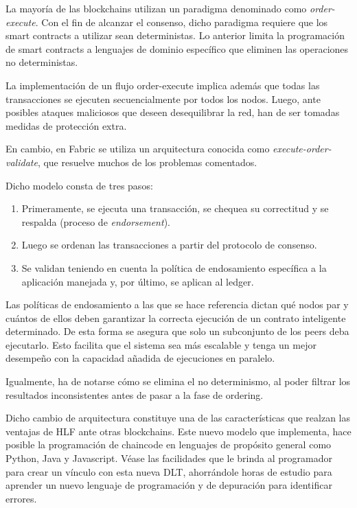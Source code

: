 La mayor\'ia de las blockchains utilizan un paradigma denominado como \emph{order-execute}. Con el fin de alcanzar el consenso, dicho paradigma requiere que los smart contracts a utilizar sean deterministas. Lo anterior limita la programaci\'on de smart contracts a lenguajes de dominio espec\'ifico que eliminen las operaciones no deterministas. 

La implementaci\'on de un flujo order-execute implica adem\'as que todas las transacciones se ejecuten secuencialmente por todos los nodos. Luego, ante posibles ataques maliciosos que deseen desequilibrar la red, han de ser tomadas medidas de protecci\'on extra.

En cambio, en Fabric se utiliza un arquitectura conocida como \emph{execute-order-validate}, que resuelve muchos de los problemas comentados.

Dicho modelo consta de tres pasos:
\begin{enumerate}
	\item Primeramente, se ejecuta una transacci\'on, se chequea su correctitud y se respalda (proceso de \emph{endorsement}).
	
	\item Luego se ordenan las transacciones a partir del protocolo de consenso.
	
	\item Se validan teniendo en cuenta la pol\'itica de endosamiento espec\'ifica a la aplicaci\'on manejada y, por \'ultimo, se aplican al ledger.
\end{enumerate}

Las pol\'iticas de endosamiento a las que se hace referencia dictan qu\'e nodos par y cu\'antos de ellos deben garantizar la correcta ejecuci\'on de un contrato inteligente determinado. De esta forma se asegura que solo un subconjunto de los peers deba ejecutarlo. Esto facilita que el sistema sea m\'as escalable y tenga un mejor desempe\~no con la capacidad a\~nadida de ejecuciones en paralelo.

Igualmente, ha de notarse c\'omo se elimina el no determinismo, al poder filtrar los resultados inconsistentes antes de pasar a la fase de ordering.

Dicho cambio de arquitectura constituye una de las caracter\'isticas que realzan las ventajas de HLF ante otras blockchains. Este nuevo modelo que implementa, hace posible la programaci\'on de chaincode en lenguajes de propósito general como Python, Java y Javascript. V\'ease las facilidades que le brinda al programador para crear un v\'inculo con esta nueva DLT, ahorr\'andole horas de estudio para aprender un nuevo lenguaje de programaci\'on y de depuraci\'on para identificar errores. %

